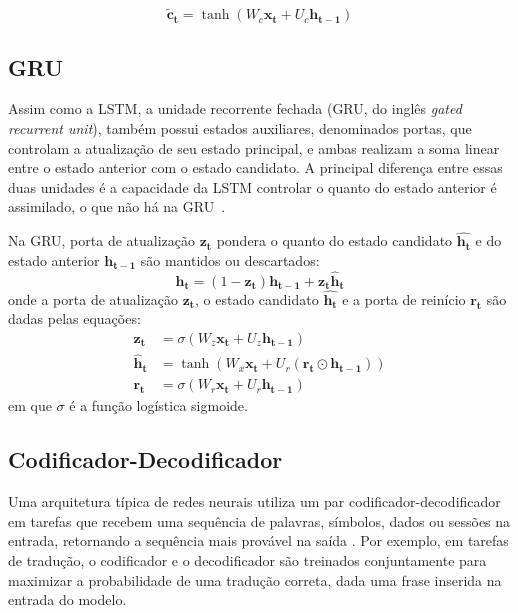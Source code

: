 \begin{equation}
    \mathbf{\tilde{c}_t} = \tanh(W_c\mathbf{x_t} + U_c\mathbf{h_{t-1}})
\end{equation}


\subsection{GRU}
Assim como a LSTM, a unidade recorrente fechada (GRU, do inglês \textit{gated
recurrent unit}), também possui estados auxiliares, denominados portas, que
controlam a atualização de seu estado principal, e ambas realizam a soma linear
entre o estado anterior com o estado candidato. A principal diferença entre
essas duas unidades é a capacidade da LSTM controlar o quanto do estado anterior
é assimilado, o que não há na GRU~\cite{chung2014empirical}.

Na GRU, porta de atualização $\mathbf{z_t}$ pondera o quanto do
estado candidato $\mathbf{\hat{h_t}}$ e do estado anterior $\mathbf{h_{t-1}}$
são mantidos ou descartados:
\begin{equation}
    \mathbf{h_t} = (1 - \mathbf{z_t})\mathbf{h_{t-1}} + \mathbf{z_t}\mathbf{\hat{h}_t}
\end{equation}
onde a porta de atualização $\mathbf{z_t}$, o estado candidato $\mathbf{\hat{h_t}}$
e a porta de reinício $\mathbf{r_t}$ são dadas pelas equações:
\begin{align}
    \mathbf{z_t} &= \sigma(W_z\mathbf{x_t} + U_z\mathbf{h_{t-1}}) \\
    \mathbf{\hat{h}_t} &= \tanh(W_x\mathbf{x_t} + U_r(\mathbf{r_t} \odot \mathbf{h_{t-1}})) \\
    \mathbf{r_t} &= \sigma(W_r\mathbf{x_t} + U_r\mathbf{h_{t-1}})
\end{align}
em que $\sigma$ é a função logística sigmoide.

\subsection{Codificador-Decodificador}
Uma arquitetura típica de redes neurais utiliza um par codificador-decodificador
em tarefas que recebem uma sequência de palavras, símbolos, dados ou sessões na
entrada, retornando a sequência mais provável na saída
\cite{bahdanau2016neural}. Por exemplo, em tarefas de tradução, o codificador e
o decodificador são treinados conjuntamente para maximizar a probabilidade de
uma tradução correta, dada uma frase inserida na entrada do modelo.

